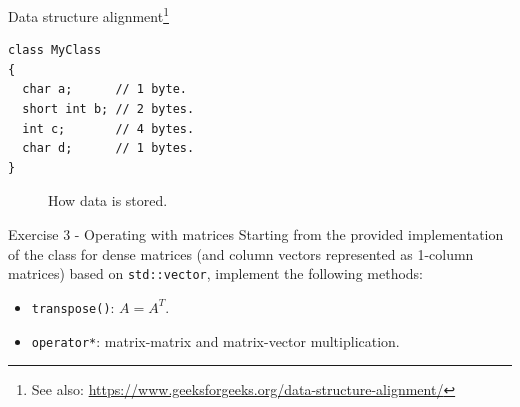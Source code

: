 \documentclass[10pt,aspectratio=169]{beamer}
\begin{document}
\begin{frame}[fragile]{Data structure alignment\footnote{See also: \url{https://www.geeksforgeeks.org/data-structure-alignment/}}}
    \begin{lstlisting}
class MyClass
{
  char a;      // 1 byte.
  short int b; // 2 bytes.
  int c;       // 4 bytes.
  char d;      // 1 bytes.
}
    \end{lstlisting}
    \begin{figure}
        \centering
        \caption{How data is  stored.}
    \end{figure}
\end{frame}


\begin{frame}{Exercise 3 - Operating with matrices}
Starting from the provided implementation of the class for dense matrices (and column vectors represented as 1-column matrices) based on \lstinline{std::vector}, implement the following methods:
\begin{itemize}
\item \lstinline{transpose()}: $A = A^{T}$.
\item \lstinline{operator*}: matrix-matrix and matrix-vector multiplication.
\end{itemize}
\end{frame}
\end{document}

